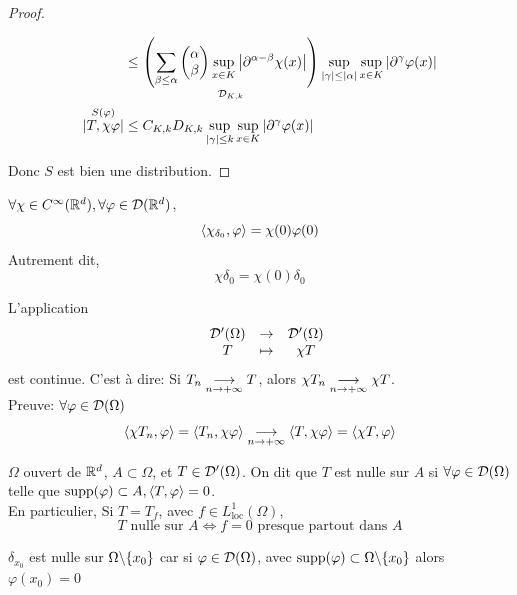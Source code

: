 \documentclass[]{report}
\begin{document}
\begin{proof}
\begin{itemize}
\begin{align*}
            &\le \underset{\mathcal{D}_{K,k}}{\left(\sum_{\beta\le \alpha} \left(\begin{matrix}
                \alpha\\
                \beta
            \end{matrix}\right) \sup_{x\in K}\left|\partial^{\alpha-\beta}\chi(x)\right|\right)}\sup_{|\gamma|\le |\alpha|}\sup_{x\in K}|\partial^{\gamma}\varphi(x)|\\
            \overset{S(\varphi)}{\left|T,\chi \varphi\right|}&\le C_{K,k}D_{K,k}\sup_{|\gamma|\le k}\sup_{x\in K}\left|\partial^{\gamma}\varphi(x)\right|
            \end{align*}
        \end{itemize}
        Donc $S$ est bien une distribution.
    \end{proof}

    \begin{ex}{}{}
        $\forall \chi \in C^{\infty}(\mathbb{R}^d),\forall \varphi\in \mathcal{D}(\mathbb{R}^d)$,
        \[\langle \chi_{\delta_0},\varphi \rangle=\chi(0)\varphi(0)\]
        Autrement dit,
        \[\chi \delta_0=\chi(0)\delta_0\]
    \end{ex}

    \begin{re}{}{}
        L'application
        \[\begin{array}{ccccc} & \mathcal{D}'(\Omega) & \to & \mathcal{D}'(\Omega) \\ & T & \mapsto & \chi T \end{array}\]
        est continue. C'est à dire: Si $T_n \underset{n\to +\infty}{\longrightarrow} T$, alors $\chi T_n\underset{n\to +\infty}{\longrightarrow} \chi T$.\\
        Preuve: $\forall \varphi \in \mathcal{D}(\Omega)$
        \[\langle \chi T_n,\varphi \rangle=\langle T_n,\chi \varphi \rangle\underset{n\to +\infty}{\longrightarrow} \langle T,\chi \varphi \rangle=\langle \chi T,\varphi \rangle\]
    \end{re}

    \begin{df}{}{}
        $\Omega$ ouvert de $\mathbb{R}^d$, $A\subset \Omega$, et $T\in \mathcal{D}'(\Omega)$. On dit que $T$ est nulle sur $A$ si $\forall \varphi \in \mathcal{D}(\Omega)$ telle que $\text{supp}(\varphi)\subset A, \langle T,\varphi \rangle=0$.\\
        En particulier, Si $T=T_f$, avec $f\in L^1_{\text{loc}}(\Omega)$,
        \[T\text{ nulle sur }A\iff f=0\text{ presque partout dans $A$}\]
    \end{df}
    
    \begin{ex}{}{}
        $\delta_{x_0}$ est nulle sur $\Omega\backslash \{x_0\}$ car si $\varphi\in \mathcal{D}(\Omega)$, avec $\text{supp}(\varphi)\subset \Omega\backslash\{x_0\}$ alors $\varphi(x_0)=0$
    \end{ex}
\end{document}
